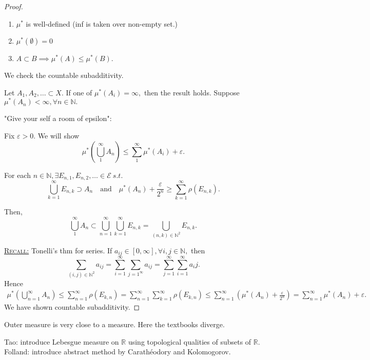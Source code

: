 \documentclass{report}
\newcommand{\R}{\mathbb{R}}
\newcommand{\N}{\mathbb{N}}
\newcommand{\st}{\ s.t.\ }
\newcommand{\fancyem}[1]{\underline{\textsc{#1}}}
\theoremstyle{definition}
\theoremstyle{remark}
\begin{document}
\begin{proof}
\begin{enumerate}
	\item
	$\mu^*$ is well-defined (inf is taken over non-empty set.)
	\item
	$\mu^*(\emptyset) = 0$
	\item
	$A \subset B \implies \mu^*(A) \leq \mu^*(B).$
\end{enumerate}
We check the countable subadditivity.

Let $A_1, A_2, \ldots \subset X.$ If one of $\mu^*(A_i) = \infty,$ then the result holds. Suppose $\mu^*(A_n) < \infty, \forall n \in \N.$

"Give your self a room of epsilon":

Fix $\varepsilon > 0.$ We will show \[\mu^*\left(\bigcup_1^\infty A_n\right) \leq \sum_1^\infty \mu^*(A_i) + \varepsilon.\]

For each $n \in \N, \exists E_{n,1}, E_{n,2}, \ldots \in \mathcal{E} \st$ \[\bigcup_{k=1}^\infty E_{n, k} \supset A_n \quad \text{and} \quad \mu^*(A_n) + \frac{\varepsilon}{2^n}\geq \sum_{k=1}^\infty \rho(E_{n, k}).\]

Then, \[
\bigcup_1^\infty A_n \subset \bigcup_{n=1}^\infty \bigcup_{k=1}^\infty E_{n, k} = \bigcup_{(n, k) \in \N^2} E_{n, k}.
\]

\fancyem{Recall:} Tonelli's thm for series.
If $a_{ij} \in [0, \infty], \forall i, j \in \N, $ then
\[
\sum_{(i, j) \in \N^2} a_{ij} = \sum_{i=1}^\infty\sum_{j=1^\infty} a_{ij} = \sum_{j=1}^\infty\sum_{i=1}^\infty a_ij.
\]
Hence 
\begin{align*}
\mu^*\left(\bigcup_{n=1}^\infty A_n\right) \leq \sum_{n=1}^\infty \rho(E_{k, n}) = \sum_{n=1}^\infty \sum_{k=1}^\infty \rho(E_{k, n}) \leq \sum_{n=1}^\infty\left(\mu^*(A_n) + \frac{\varepsilon}{2^n}\right) = \sum_{n=1}^\infty \mu^*(A_n) + \varepsilon.
\end{align*}
We have shown countable subadditivity.
\end{proof}

Outer measure is very close to a measure. Here the textbooks diverge.

Tao: introduce Lebesgue measure on $\R$ using topological qualities of subsets of $\R.$\\
Folland: introduce abstract method by Carathéodory and Kolomogorov.
\end{document}
